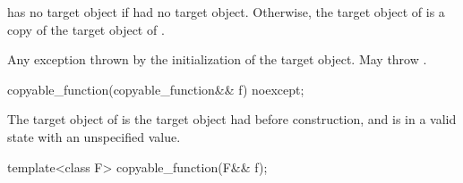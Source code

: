 \begin{itemdescr}
\pnum
\ensures
{} has no target object if  had no target object.
Otherwise, the target object of 
is a copy of the target object of .

\pnum
\throws
Any exception thrown by the initialization of the target object.
May throw .
\end{itemdescr}

%
\begin{itemdecl}
copyable_function(copyable_function&& f) noexcept;
\end{itemdecl}

\begin{itemdescr}
\pnum
\ensures
The target object of  is
the target object  had before construction, and
 is in a valid state with an unspecified value.
\end{itemdescr}

%
\begin{itemdecl}
template<class F> copyable_function(F&& f);
\end{itemdecl}


